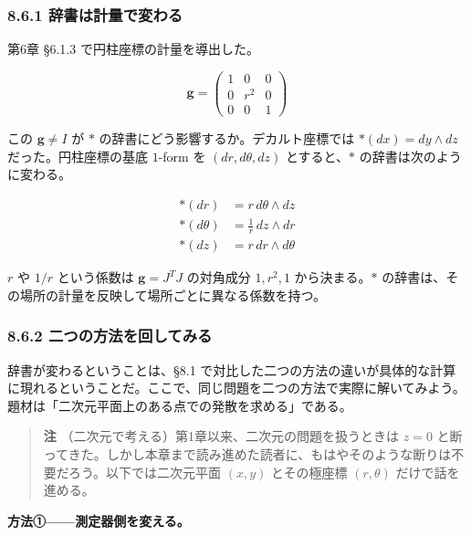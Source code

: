 \documentclass[a4paper,12pt,openany]{book}
\begin{document}
\hypertarget{ux8f9eux66f8ux306fux8a08ux91cfux3067ux5909ux308fux308b}{%
\subsubsection{8.6.1
辞書は計量で変わる}\label{ux8f9eux66f8ux306fux8a08ux91cfux3067ux5909ux308fux308b}}

第6章 §6.1.3 で円柱座標の計量を導出した。

\[\mathbf{g} = \begin{pmatrix} 1 & 0 & 0 \\ 0 & r^2 & 0 \\ 0 & 0 & 1 \end{pmatrix}\]

この \(\mathbf{g} \neq I\) が \(\ast\)
の辞書にどう影響するか。デカルト座標では \(\ast(dx) = dy \wedge dz\)
だった。円柱座標の基底 \(1\)-form を \((dr, d\theta, dz)\)
とすると、\(\ast\) の辞書は次のように変わる。

\[\begin{aligned}
\ast(dr) &= r\,d\theta \wedge dz \\
\ast(d\theta) &= \frac{1}{r}\,dz \wedge dr \\
\ast(dz) &= r\,dr \wedge d\theta
\end{aligned}\]

\(r\) や \(1/r\) という係数は \(\mathbf{g} = J^T J\) の対角成分
\(1, r^2, 1\) から決まる。\(\ast\)
の辞書は、その場所の計量を反映して場所ごとに異なる係数を持つ。

\hypertarget{ux4e8cux3064ux306eux65b9ux6cd5ux3092ux56deux3057ux3066ux307fux308b}{%
\subsubsection{8.6.2
二つの方法を回してみる}\label{ux4e8cux3064ux306eux65b9ux6cd5ux3092ux56deux3057ux3066ux307fux308b}}

辞書が変わるということは、§8.1
で対比した二つの方法の違いが具体的な計算に現れるということだ。ここで、同じ問題を二つの方法で実際に解いてみよう。題材は「二次元平面上のある点での発散を求める」である。

\begin{quote}
\textbf{注} （二次元で考える）第1章以来、二次元の問題を扱うときは
\(z=0\)
と断ってきた。しかし本章まで読み進めた読者に、もはやそのような断りは不要だろう。以下では二次元平面
\((x,y)\) とその極座標 \((r,\theta)\) だけで話を進める。
\end{quote}

\textbf{方法①——測定器側を変える。}
\end{document}

